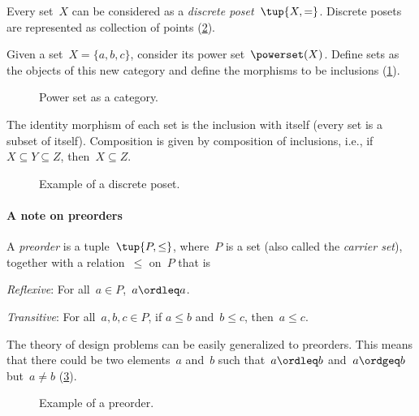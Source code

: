\begin{example}
\label{ex:discreteposet}
Every set~$X$ can be considered as a \emph{discrete poset}~$\tup{X,=}$. Discrete posets are represented as collection of points (\cref{fig:discretepos}).

\begin{example}
\label{ex:hasseinclusion}
Given a set~$X=\{a,b,c\}$, consider its power set~$\powerset(X)$. Define sets as the objects of this new category and define the morphisms to be inclusions (\cref{fig:powersetcat}).
\begin{figure}[h!]
\begin{center}
\end{center}
\caption{Power set as a category. \label{fig:powersetcat}}
\end{figure}
The identity morphism of each set is the inclusion with itself (every set is a subset of itself). Composition is given by composition of inclusions, i.e., if~$X\subseteq Y \subseteq Z$, then~$X\subseteq Z$. 
\end{example}

\begin{figure}[tbh]
   \centering
   \caption{Example of a discrete poset. \label{fig:discretepos}}
\end{figure}
\end{example}

\paragraph{A note on preorders}
\begin{definition}[Preorder]
\label{def:preorder}
A \emph{preorder} is a tuple~$\tup{P, \leq}$,
where~$P$ is a set (also called the \emph{carrier set}), together with a
relation~$\leq$ on~$P$ that is
\begin{compactenum}
    \item \emph{Reflexive}: For all~$a\in P$,~$a\ordleq a$.
    \item \emph{Transitive}: For all~$a,b,c\in P$, if $a\leq b$ and~$b\leq c$, then~$a\leq c$.
\end{compactenum}
\end{definition}
The theory of design problems can be easily generalized to preorders. This means that there could be two elements~$a$ and~$b$ such that~$a\ordleq b$ and~$a \ordgeq b$ but~$a \neq b$ (\cref{fig:preorder}).

\begin{figure}[tbh]
\begin{center}
\end{center}
\caption{Example of a preorder. \label{fig:preorder}}
\end{figure}

